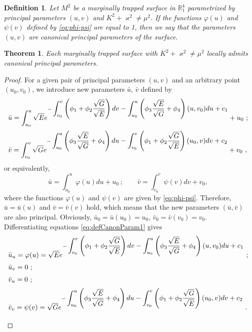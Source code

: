 \documentclass[10pt,a4paper]{amsart}
\newtheorem{defn}{Definition}
\newtheorem{thm}{Theorem}
\newcommand{\R}{\mathbb R}
\newcommand{\ds}{\displaystyle}
\begin{document}
\begin{defn} \label{D:def-can}
Let $M^2$ be a marginally trapped surface in $\R^4_1$ parametrized by principal parameters $(u,v)$ and  $K^2+\varkappa^2 \neq \mu^2$. If the functions $\varphi(u)$ and $\psi(v)$ defined by \eqref{eq:phi-psi} are equal to 1, then we say that the parameters $(u,v)$ are {\it canonical principal parameters} of the surface.
\end{defn}

\begin{thm} \label{eq:ExistenceCanonicalParameters}
	Each marginally trapped surface with  $K^2+\varkappa^2 \neq \mu^2$ locally admits canonical principal parameters.
\end{thm}

\begin{proof}
	For a given  pair of principal parameters $(u,v)$ and an arbitrary point $(u_0,v_0)$, we introduce new parameters $\bar u$, $\bar v$ defined by
	\begin{equation*} \label{eq:defCanonParam}
		\begin{array}{l}
			\bar u=\ds\int_{u_0}^u\sqrt Ee^{-\ds\int_{v_0}^v\left(\phi_1+\phi_2\frac{\sqrt G}{\sqrt E}\right)dv
				-\int_{u_0}^u\left(\phi_3\frac{\sqrt E}{\sqrt G}+\phi_4\right)(u,v_0)du+c_1} +u_0 \vspace{2mm} \ ;\\
			\bar v=\ds\int_{v_0}^v\sqrt Ge^{-\ds\int_{u_0}^u\left(\phi_3\frac{\sqrt E}{\sqrt G}+\phi_4\right)du
				-\int_{v_0}^v\left(\phi_1+\phi_2\frac{\sqrt G}{\sqrt E}\right)(u_0,v)dv+c_2} +v_0 \ ,
		\end{array}
	\end{equation*}  
	or equivalently,
	\begin{equation} \label{eq:defCanonParam1}
	\bar u=\int_{u_0}^u \varphi(u) du +u_0 \ ;   \qquad  \bar v=\int_{v_0}^v \psi(v) dv +v_0 ,
		\end{equation}  
	where the functions $\varphi(u)$ and $\psi(v)$ are given by \eqref{eq:phi-psi}. Therefore,  $\bar u=\bar u(u)$ and $\bar v=\bar v(v)$ hold, which means that the new  parameters 
	$(\bar u, \bar v)$ are also principal. Obviously, $\bar u_0=\bar u(u_0)=u_0$, 
	$\bar v_0=\bar v(v_0)=v_0$. Differentiating  equations \eqref{eq:defCanonParam1} gives
	\begin{equation*} 
		\begin{array}{l} 
			\vspace{2mm}
	\bar u_u = \varphi(u) =\sqrt Ee^{-\ds\int_{v_0}^v\left(\phi_1+\phi_2\frac{\sqrt G}{\sqrt E}\right)dv
		-\int_{u_0}^u\left(\phi_3\frac{\sqrt {E}}{\sqrt {G}}+\phi_4\right)(u,v_0)du+c_1} \ ;\\
			\vspace{2mm}
	\bar u_v = 0 \ ;\\
	\vspace{2mm}
	\bar v_u = 0 \ ;\\
	\vspace{2mm}
	\bar v_v = \psi(v) =\sqrt Ge^{-\ds\int_{u_0}^u\left(\phi_3\frac{\sqrt E}{\sqrt G}+\phi_4\right)du
		-\int_{v_0}^v\left(\phi_1+\phi_2\frac{\sqrt G}{\sqrt E}\right)(u_0,v)dv+c_2} \ .
	\end{array}   
	\end{equation*}
	

\end{proof}
\end{document}
